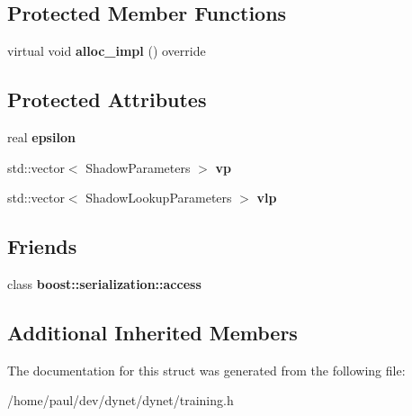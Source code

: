 \subsection*{Protected Member Functions}
\begin{DoxyCompactItemize}
\item 
\hypertarget{structdynet_1_1AdagradTrainer_a59aedeee8ebf2381aae2e621dc0933ba}{}virtual void {\bfseries alloc\+\_\+impl} () override\label{structdynet_1_1AdagradTrainer_a59aedeee8ebf2381aae2e621dc0933ba}

\end{DoxyCompactItemize}
\subsection*{Protected Attributes}
\begin{DoxyCompactItemize}
\item 
\hypertarget{structdynet_1_1AdagradTrainer_aec2c7f16d917701afcc033e74df521ce}{}real {\bfseries epsilon}\label{structdynet_1_1AdagradTrainer_aec2c7f16d917701afcc033e74df521ce}

\item 
\hypertarget{structdynet_1_1AdagradTrainer_acec2f473f86ca026818ae76c8b3172cc}{}std\+::vector$<$ Shadow\+Parameters $>$ {\bfseries vp}\label{structdynet_1_1AdagradTrainer_acec2f473f86ca026818ae76c8b3172cc}

\item 
\hypertarget{structdynet_1_1AdagradTrainer_a4198955558c37a432400f163aada58f6}{}std\+::vector$<$ Shadow\+Lookup\+Parameters $>$ {\bfseries vlp}\label{structdynet_1_1AdagradTrainer_a4198955558c37a432400f163aada58f6}

\end{DoxyCompactItemize}
\subsection*{Friends}
\begin{DoxyCompactItemize}
\item 
\hypertarget{structdynet_1_1AdagradTrainer_ac98d07dd8f7b70e16ccb9a01abf56b9c}{}class {\bfseries boost\+::serialization\+::access}\label{structdynet_1_1AdagradTrainer_ac98d07dd8f7b70e16ccb9a01abf56b9c}

\end{DoxyCompactItemize}
\subsection*{Additional Inherited Members}


The documentation for this struct was generated from the following file\+:\begin{DoxyCompactItemize}
\item 
/home/paul/dev/dynet/dynet/training.\+h\end{DoxyCompactItemize}
